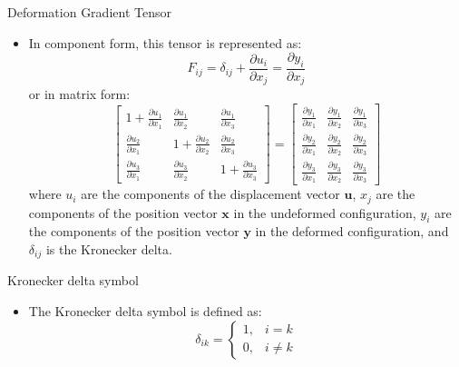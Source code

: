 \documentclass{beamer}
\begin{document}
\begin{frame}{Deformation Gradient Tensor}
\begin{itemize}
        \item In component form, this tensor is represented as:
            \[
            F_{ij} = \delta_{ij} + \frac{\partial u_i}{\partial x_j} = \frac{\partial y_i}{\partial x_j}
            \]
            or in matrix form:
            \[
            \begin{bmatrix}
                1 + \frac{\partial u_1}{\partial x_1} & \frac{\partial u_1}{\partial x_2} & \frac{\partial u_1}{\partial x_3} \\
                \frac{\partial u_2}{\partial x_1} & 1 + \frac{\partial u_2}{\partial x_2} & \frac{\partial u_2}{\partial x_3} \\
                \frac{\partial u_3}{\partial x_1} & \frac{\partial u_3}{\partial x_2} & 1 + \frac{\partial u_3}{\partial x_3}
            \end{bmatrix}
            =
            \begin{bmatrix}
                \frac{\partial y_1}{\partial x_1} & \frac{\partial y_1}{\partial x_2} & \frac{\partial y_1}{\partial x_3} \\
                \frac{\partial y_2}{\partial x_1} & \frac{\partial y_2}{\partial x_2} & \frac{\partial y_2}{\partial x_3} \\
                \frac{\partial y_3}{\partial x_1} & \frac{\partial y_3}{\partial x_2} & \frac{\partial y_3}{\partial x_3}
            \end{bmatrix}
            \]
            where \(u_i\) are the components of the displacement vector \(\mathbf{u}\), \(x_j\) are the components of the position vector \(\mathbf{x}\) in the undeformed configuration, \(y_i\) are the components of the position vector \(\mathbf{y}\) in the deformed configuration, and \(\delta_{ij}\) is the Kronecker delta.
    \end{itemize}
\end{frame}

\begin{frame}{Kronecker delta symbol}
    \begin{itemize}
        \item  The Kronecker delta symbol is defined as:
        $$
        \delta_{ik}=\begin{cases}
          1, & i=k \\
          0, & i \ne k
        \end{cases}
        $$
    \end{itemize}
\end{frame}
\end{document}
